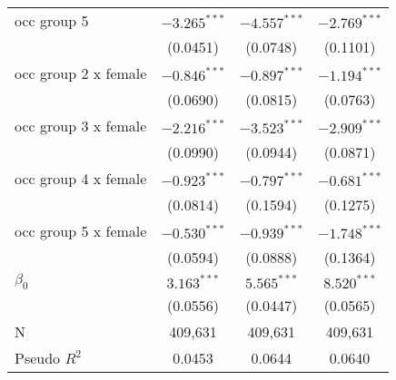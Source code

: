 \begin{tabular}{l|ccc|}
occ group 5                &  $-3.265^{***}$ &  $-4.557^{***}$ &  $-2.769^{***}$ \\
                           &        (0.0451) &        (0.0748) &        (0.1101) \\
occ group 2 x female       &  $-0.846^{***}$ &  $-0.897^{***}$ &  $-1.194^{***}$ \\
                           &        (0.0690) &        (0.0815) &        (0.0763) \\
occ group 3 x female       &  $-2.216^{***}$ &  $-3.523^{***}$ &  $-2.909^{***}$ \\
                           &        (0.0990) &        (0.0944) &        (0.0871) \\
occ group 4 x female       &  $-0.923^{***}$ &  $-0.797^{***}$ &  $-0.681^{***}$ \\
                           &        (0.0814) &        (0.1594) &        (0.1275) \\
occ group 5 x female       &  $-0.530^{***}$ &  $-0.939^{***}$ &  $-1.748^{***}$ \\
                           &        (0.0594) &        (0.0888) &        (0.1364) \\
$\beta_0$                  &   $3.163^{***}$ &   $5.565^{***}$ &   $8.520^{***}$ \\
                           &        (0.0556) &        (0.0447) &        (0.0565) \\
N                          &         409,631 &         409,631 &         409,631 \\
Pseudo $R^2$               &          0.0453 &          0.0644 &          0.0640 \\
\bottomrule
\end{tabular}
